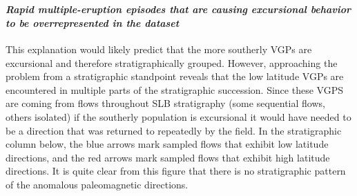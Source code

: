 \documentclass{article}
\begin{document}
    \begin{center}
    \end{center}
    { \hspace*{\fill} \\}
    
\paragraph{\texorpdfstring{\emph{Rapid multiple-eruption episodes that are causing excursional behavior to be overrepresented in the dataset}}{Rapid multiple-eruption episodes that are causing excursional behavior to be overrepresented in the dataset}}\label{rapid-multiple-eruption-episodes-that-are-causing-excursional-behavior-to-be-overrepresented-in-the-dataset}
This explanation would likely predict that the more southerly VGPs are excursional and therefore stratigraphically grouped. However, approaching the problem from a stratigraphic standpoint reveals that the low latitude VGPs are encountered in multiple parts of the stratigraphic succession. Since these VGPS are coming from flows throughout SLB stratigraphy (some sequential flows, others isolated) if the southerly population is excursional it would have needed to be a direction that was returned to repeatedly by the field. In the stratigraphic column below, the blue arrows mark sampled flows that exhibit low latitude directions, and the red arrows mark sampled flows that exhibit high latitude directions. It is quite clear from this figure that there is no stratigraphic pattern of the anomalous paleomagnetic directions.\\
\end{document}
